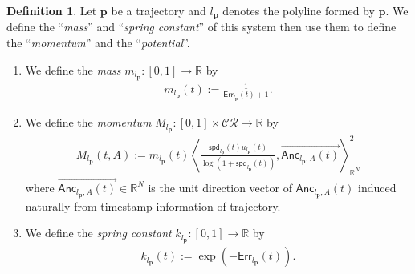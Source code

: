 \documentclass{article}
\numberwithin{equation}{section}
\theoremstyle{definition}
\newtheorem{definition}{Definition}[section]
\newcommand{\CR}{\mathcal{CR}}
\newcommand{\err}{\mathsf{Err}}
\newcommand{\R}{\mathbb{R}}
\newcommand{\spd}{\mathsf{spd}}
\begin{document}
\begin{definition}
    Let $\mathbf{p}$ be a trajectory and $l_\mathbf{p}$ denotes the polyline formed by $\mathbf{p}$.
    We define the ``\emph{mass}'' and ``\emph{spring constant}'' of this system then use them to define the ``\emph{momentum}'' and the ``\emph{potential}''.
    
    \begin{enumerate}
        \item 
        We define the \emph{mass} $m_{l_{\mathbf{p}}}:[0,1]\to\R$ by
            \begin{align*}
                m_{l_{\mathbf{p}}}(t) := \frac{1}{\err_{l_{\mathbf{p}}}(t)+1}.
            \end{align*}
            
        \item
        We define the \emph{momentum} $M_{l_{\mathbf{p}}}:[0,1]\times\CR\to\R$ by
            \begin{align}
                M_{l_{\mathbf{p}}}(t,A) := m_{l_{\mathbf{p}}}(t)\left\langle\frac{\spd_{l_{\mathbf{p}}}(t)u_{l_{\mathbf{p}}}(t)}{\log(1+\spd_{l_{\textbf{p}}}(t))} , \overrightarrow{\mathsf{Anc}_{l_{\mathbf{p}},A}(t)}\right\rangle_{\R^{N}}^{2}
            \end{align}
        where $\overrightarrow{\mathsf{Anc}_{l_{\mathbf{p}},A}(t)}\in\R^{N}$ is the unit direction vector of $\mathsf{Anc}_{l_{\mathbf{p}},A}(t)$ induced naturally from timestamp information of trajectory.
        \item
        We define the \emph{spring constant} $k_{l_{\mathbf{p}}}:[0,1]\to\R$ by
        \begin{align}
            k_{l_{\mathbf{p}}}(t) := \exp{\left(-\err_{l_{\mathbf{p}}}(t)\right)}.
        \end{align}
        

\end{enumerate}
\end{definition}
\end{document}
